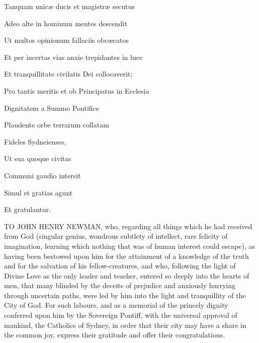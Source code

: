 Tanquam unicæ ducis et magistræ secutus

Adeo alte in hominum mentes descendit

Ut multos opinionum fallaciis obcæcatos

Et per incertas vias anxie trepidantes in luce

Et tranquillitate civilatis Dei collocaverit;

Pro tantis meritis et ob Principatus in Ecclesia

Dignitatem a Summo Pontifice

Plaudente orbe terrarum collatam

Fideles Sydneienses,

Ut sua quoque civitas

Communi gaudio intersit

Simul et gratias agunt

Et gratulantur.

TO JOHN
HENRY NEWMAN,
who, regarding all things which he had received from God (singular
genius, wondrous subtlety of intellect, rare felicity of imagination,
learning which nothing that was of human interest could escape), as
having been bestowed upon him for the attainment of a knowledge of the
truth and for the salvation of his fellow-creatures, and who,
following the light of Divine Love as the only leader and teacher,
entered so deeply into the hearts of men, that many blinded by the
deceits of prejudice and anxiously hurrying through uncertain paths,
were led by him into the light and tranquillity of the City of God.
For such labours, and as a memorial of the princely dignity conferred
upon him by the Sovereign Pontiff, with the universal approval of
mankind, the Catholics of Sydney, in order that their city may have a
share in the common joy, express their gratitude and offer their
congratulations.


